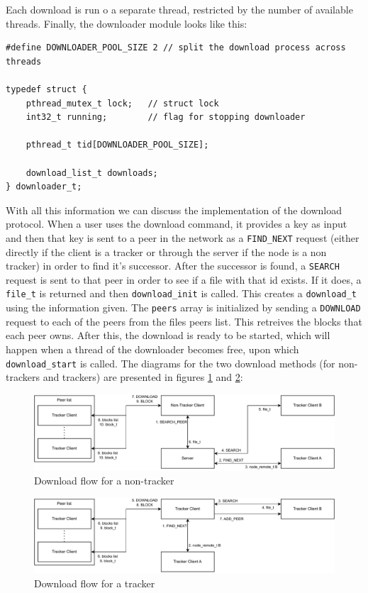 \documentclass[runningheads]{llncs}
\begin{document}
Each download is run o a separate thread, restricted by the number of available threads. Finally, the downloader module looks like this:
\begin{lstlisting}
#define DOWNLOADER_POOL_SIZE 2 // split the download process across threads

typedef struct {
    pthread_mutex_t lock;   // struct lock
    int32_t running;        // flag for stopping downloader

    pthread_t tid[DOWNLOADER_POOL_SIZE];

    download_list_t downloads;
} downloader_t;
\end{lstlisting}
With all this information we can discuss the implementation of the download protocol. When a user uses the download command, it provides a key as input and then that key is sent to a peer in the network as a \verb|FIND_NEXT| request (either directly if the client is a tracker or through the server if the node is a non tracker) in order to find it's successor. After the successor is found, a \verb|SEARCH| request is sent to that peer in order to see if a file with that id exists. If it does, a \verb|file_t| is returned and then \verb|download_init| is called. This creates a \verb|download_t| using the information given. The \verb|peers| array is initialized by sending a \verb|DOWNLOAD| request to each of the peers from the files peers list. This retreives the blocks that each peer owns. After this, the download is ready to be started, which will happen when a thread of the downloader becomes free, upon which \verb|download_start| is called. The diagrams for the two download methods (for non-trackers and trackers) are presented in figures \ref{non_tracker_download} and \ref{tracker_download}:
\begin{figure}
\includegraphics[width=\textwidth]{non_tracker_download.drawio.pdf}
\caption{Download flow for a non-tracker} \label{non_tracker_download}
\end{figure}
\begin{figure}
\includegraphics[width=\textwidth]{tracker_download.drawio.pdf}
\caption{Download flow for a tracker} \label{tracker_download}
\end{figure}
\end{document}
